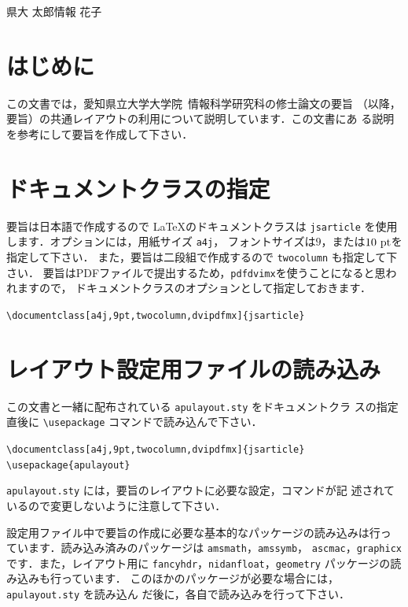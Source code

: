 \documentclass[a4j,9pt,twocolumn,dvipdfmx]{jsarticle}
\begin{document}
{県大 太郎}{情報 花子}

\section{はじめに}
この文書では，愛知県立大学大学院~情報科学研究科の修士論文の要旨
（以降，要旨）の共通レイアウトの利用について説明しています．この文書にあ
る説明を参考にして要旨を作成して下さい．

\section{ドキュメントクラスの指定}
要旨は日本語で作成するので \LaTeX のドキュメントクラスは
\texttt{jsarticle} を使用します．オプションには，用紙サイズ \texttt{a4j}，
フォントサイズは$9$，または$10\ {\rm pt}$を指定して下さい．
また，要旨は二段組で作成するので \texttt{twocolumn} も指定して下さい．
要旨はPDFファイルで提出するため，\texttt{pdfdvimx}を使うことになると思われますので，
ドキュメントクラスのオプションとして指定しておきます．
\begin{screen}
 \begin{small}
  \verb#\documentclass[a4j,9pt,twocolumn,dvipdfmx]{jsarticle}#%
 \end{small}
\end{screen}

\section{レイアウト設定用ファイルの読み込み}
この文書と一緒に配布されている \texttt{apulayout.sty} をドキュメントクラ
スの指定直後に \verb#\usepackage# コマンドで読み込んで下さい．
\begin{screen}
 \begin{small}
  \verb#\documentclass[a4j,9pt,twocolumn,dvipdfmx]{jsarticle}#\\[-0.5em]
  \verb#\usepackage{apulayout}#
 \end{small}
\end{screen}

\texttt{apulayout.sty} には，要旨のレイアウトに必要な設定，コマンドが記
述されているので変更しないように注意して下さい．

設定用ファイル中で要旨の作成に必要な基本的なパッケージの読み込みは行っ
ています．読み込み済みのパッケージは \texttt{amsmath}，\texttt{amssymb}，
\texttt{ascmac}，\texttt{graphicx} です．また，レイアウト用に
\texttt{fancyhdr}，\texttt{nidanfloat}，\texttt{geometry} パッケージの読
み込みも行っています．
このほかのパッケージが必要な場合には，\texttt{apulayout.sty} を読み込ん
だ後に，各自で読み込みを行って下さい．
\end{document}
